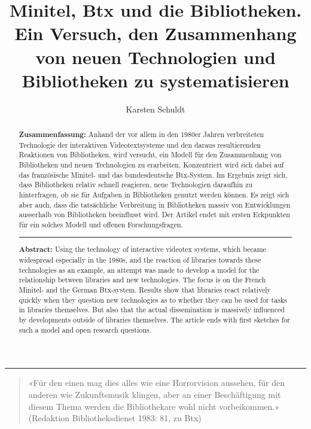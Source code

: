 \documentclass[a4paper,
fontsize=11pt,
oneside,
numbers=noperiodatend,
parskip=half-,
bibliography=totoc,
final
]{scrartcl}
\title{\LARGE{Minitel, Btx und die Bibliotheken. Ein Versuch, den Zusammenhang von neuen Technologien und Bibliotheken zu systematisieren}}%
\author{Karsten Schuldt} %
\date{}
\begin{document}
\maketitle
\thispagestyle{fancyplain} 

\begin{abstract}
\noindent
\textbf{Zusammenfassung:} Anhand der vor allem in den 1980er Jahren
verbreiteten Technologie der interaktiven Videotextsysteme und den
daraus resultierenden Reaktionen von Bibliotheken, wird versucht, ein
Modell für den Zusammenhang von Bibliotheken und neuen Technologien zu
erarbeiten. Konzentriert wird sich dabei auf das französische Minitel-
und das bundesdeutsche Btx-System. Im Ergebnis zeigt sich, dass
Bibliotheken relativ schnell reagieren, neue Technologien daraufhin zu
hinterfragen, ob sie für Aufgaben in Bibliotheken genutzt werden können.
Es zeigt sich aber auch, dass die tatsächliche Verbreitung in
Bibliotheken massiv von Entwicklungen ausserhalb von Bibliotheken
beeinflusst wird. Der Artikel endet mit ersten Eckpunkten für ein
solches Modell und offenen Forschungsfragen.

\begin{center}\rule{0.5\linewidth}{0.5pt}\end{center}

\noindent
\textbf{Abstract:} Using the technology of interactive videotex systems,
which became widespread especially in the 1980s, and the reaction of
libraries towards these technologies as an example, an attempt was made
to develop a model for the relationship between libraries and new
technologies. The focus is on the French Minitel- and the German
Btx-system. Results show that libraries react relatively quickly when
they question new technologies as to whether they can be used for tasks
in libraries themselves. But also that the actual dissemination is
massively influenced by developments outside of libraries themselves.
The article ends with first sketches for such a model and open research
questions.
\end{abstract}


\begin{center}\rule{0.5\linewidth}{0.5pt}\end{center}

\begin{quote}
«Für den einen mag dies alles wie eine Horrorvision aussehen, für den
anderen wie Zukunftsmusik klingen, aber an einer Beschäftigung mit
diesem Thema werden die Bibliothekare wohl nicht vorbeikommen.»
(Redaktion Bibliotheksdienst 1983: 81, zu Btx)
\end{quote}
\end{document}
